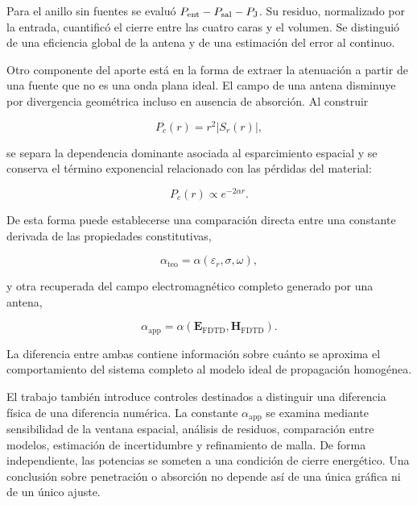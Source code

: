 Para el anillo sin fuentes se evaluó $P_{\rm ent}-P_{\rm sal}-P_{\rm J}$. Su residuo, normalizado por la entrada, cuantificó el cierre entre las cuatro caras y el volumen. Se distinguió de una eficiencia global de la antena y de una estimación del error al continuo.

Otro componente del aporte está en la forma de extraer la atenuación a partir de una fuente que no es una onda plana ideal. El campo de una antena disminuye por divergencia geométrica incluso en ausencia de absorción. Al construir

\begin{equation}
P_c(r)
=
r^2|S_r(r)|,
\end{equation}

se separa la dependencia dominante asociada al esparcimiento espacial y se conserva el término exponencial relacionado con las pérdidas del material:

\begin{equation}
P_c(r)
\propto
e^{-2\alpha r}.
\end{equation}

De esta forma puede establecerse una comparación directa entre una constante derivada de las propiedades constitutivas,

\begin{equation}
\alpha_{\mathrm{teo}}
=
\alpha(\varepsilon_r,\sigma,\omega),
\end{equation}

y otra recuperada del campo electromagnético completo generado por una antena,

\begin{equation}
\alpha_{\mathrm{app}}
=
\alpha(\mathbf{E}_{\mathrm{FDTD}},
\mathbf{H}_{\mathrm{FDTD}}).
\end{equation}

La diferencia entre ambas contiene información sobre cuánto se aproxima el comportamiento del sistema completo al modelo ideal de propagación homogénea.

El trabajo también introduce controles destinados a distinguir una diferencia física de una diferencia numérica. La constante $\alpha_{\mathrm{app}}$ se examina mediante sensibilidad de la ventana espacial, análisis de residuos, comparación entre modelos, estimación de incertidumbre y refinamiento de malla. De forma independiente, las potencias se someten a una condición de cierre energético. Una conclusión sobre penetración o absorción no depende así de una única gráfica ni de un único ajuste.

